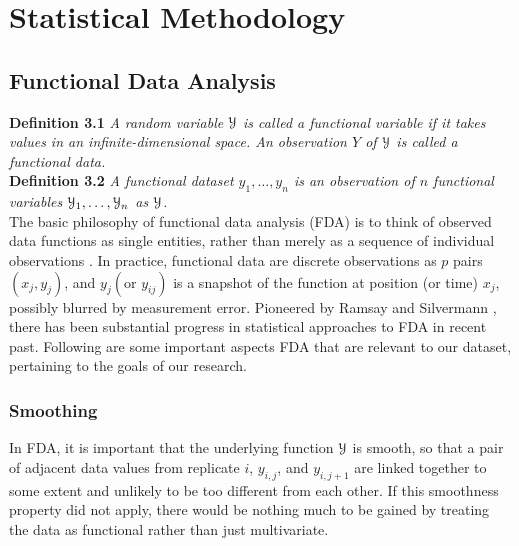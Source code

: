 \chapter{Statistical Methodology}

\section{Functional Data Analysis}
\noindent
{\bf{Definition 3.1}} {\emph{A random variable $\mathcal{Y}$ is called a functional variable if it takes values in an infinite-dimensional space. An observation $Y$ of $\mathcal{Y}$ is called a functional data. \cite{Ferraty_Vieu_2006_Nonparametric}}}\\
\noindent
{\bf{Definition 3.2}} {\emph{A functional dataset $y_1, \dots, y_n$ is an observation of $n$ functional variables $\mathcal{Y}_1, \dots, \mathcal{Y}_n$ as $\mathcal{Y}$.}}\\

The basic philosophy of functional data analysis (FDA) is to think of observed data functions as single entities, rather than merely as a sequence of individual observations \cite{Ramsay_2006_Functional}. In
practice, functional data are discrete observations as $p$ pairs $(x_j, y_j)$, and $y_j (\text{or } y_{ij})$ is a snapshot of the function at position (or time) $x_j$, possibly blurred by measurement error. Pioneered by Ramsay and Silvermann \cite{Ramsay_2006_Functional}, there has been substantial progress in statistical approaches to FDA in recent past. Following are some important aspects FDA that are relevant to our dataset, pertaining to the goals of our research. 

\subsection{Smoothing}
In FDA, it is important that the underlying function $\mathcal{Y}$ is smooth, so that a pair of adjacent data values from replicate $i$, $y_{i,j}$, and $y_{i,j+1}$ are linked together to some extent and unlikely to be too different from each other. If this smoothness property did not apply, there would be nothing much to be gained by treating the data as functional rather than just multivariate. 

